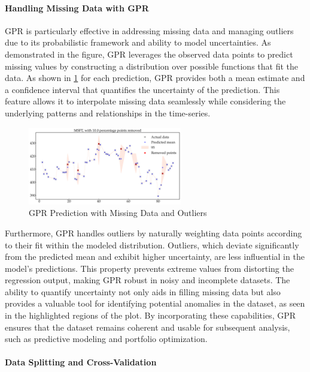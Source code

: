 \paragraph{Handling Missing Data with GPR}
\ac{GPR} is particularly effective in addressing missing data and managing outliers due to its probabilistic framework and ability to model uncertainties. As demonstrated in the figure, GPR leverages the observed data points to predict missing values by constructing a distribution over possible functions that fit the data. 
As shown in \ref{fig:gpr_missing_outliers} for each prediction, GPR provides both a mean estimate and a confidence interval that quantifies the uncertainty of the prediction. This feature allows it to interpolate missing data seamlessly while considering the underlying patterns and relationships in the time-series.

\begin{figure}[htbp]
    \centering
    \includegraphics[width=0.6\textwidth]{figures/predicted_MSFT_with_removed.png}
    \caption{GPR Prediction with Missing Data and Outliers}
    \label{fig:gpr_missing_outliers}
\end{figure}

Furthermore, GPR handles outliers by naturally weighting data points according to their fit within the modeled distribution. Outliers, which deviate significantly from the predicted mean and exhibit higher uncertainty, are less influential in the model's predictions. This property prevents extreme values from distorting the regression output, making GPR robust in noisy and incomplete datasets. The ability to quantify uncertainty not only aids in filling missing data but also provides a valuable tool for identifying potential anomalies in the dataset, as seen in the highlighted regions of the plot. By incorporating these capabilities, GPR ensures that the dataset remains coherent and usable for subsequent analysis, such as predictive modeling and portfolio optimization.


\paragraph{Data Splitting and Cross-Validation}

